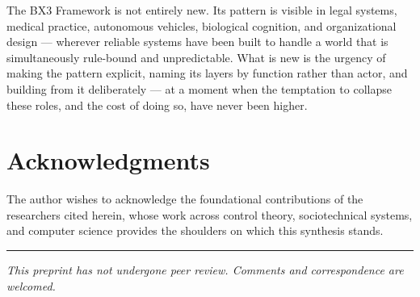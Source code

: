 \documentclass[12pt]{article}
\begin{document}
The BX3 Framework is not entirely new. Its pattern is visible in legal systems, medical practice, autonomous vehicles, biological cognition, and organizational design --- wherever reliable systems have been built to handle a world that is simultaneously rule-bound and unpredictable. What is new is the urgency of making the pattern explicit, naming its layers by function rather than actor, and building from it deliberately --- at a moment when the temptation to collapse these roles, and the cost of doing so, have never been higher.

\section*{Acknowledgments}

The author wishes to acknowledge the foundational contributions of the researchers cited herein, whose work across control theory, sociotechnical systems, and computer science provides the shoulders on which this synthesis stands.




\vspace{2em}
\hrule
\vspace{0.5em}
\noindent\small\textit{This preprint has not undergone peer review. Comments and correspondence are welcomed.}
\end{document}
